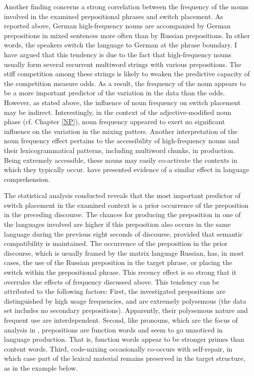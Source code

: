 Another finding concerns a strong correlation between the frequency of the nouns involved in the examined prepositional phrases and switch placement. As reported above, German high-frequency nouns are accompanied by German prepositions in mixed sentences more often than by Russian prepositions. In other words, the speakers switch the language to German at the phrase boundary. I have argued that this tendency is due to the fact that high-frequency nouns usually form several recurrent multiword strings with various prepositions. The stiff competition among these strings is likely to weaken the predictive capacity of the competition measure odds. As a result, the frequency of the noun appears to be a more important predictor of the variation in the data than the odds. However, as stated above, the influence of noun frequency on switch placement may be indirect. Interestingly, in the context of the adjective-modified noun phase (cf. Chapter \ref{NP}), noun frequency appeared to exert no significant influence on the variation in the mixing patters. Another interpretation of the noun frequency effect pertains to the accessibility of high-frequency nouns and their lexicogrammatical patterns, including multiword chunks, in production. Being extremely accessible, these nouns may easily co-activate the contexts in which they typically occur. \citet{arnon-snider} have presented evidence of a similar effect in language comprehension. 

The statistical analysis conducted reveals that the most important predictor of switch placement in the examined context is a prior occurrence of the preposition in the preceding discourse. The chances for producing the preposition in one of the languages involved are higher if this preposition also occurs in the same language during the previous eight seconds of discourse, provided that semantic compatibility is maintained. The occurrence of the preposition in the prior discourse, which is usually framed by the matrix language Russian, has, in most cases, the use of the Russian preposition in the target phrase, or placing the switch within the prepositional phrase. This recency effect is so strong that it overrules the effects of frequency discussed above. This tendency can be attributed to the following factors: First, the investigated prepositions are distinguished by high usage frequencies, and are extremely polysemous (the data set includes no secondary prepositions). Apparently, their polysemous nature and frequent use are interdependent. Second, like pronouns, which are the focus of analysis in \citet{torres-travis}, prepositions are function words and seem to go unnoticed in language production. That is, function words appear to be stronger primes than content words. Third, code-mixing occasionally co-occurs with self-repair, in which case part of the lexical material remains preserved in the target structure, as in the example below.

